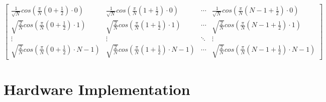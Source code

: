 \begin{center}	
$ \begin{bmatrix} \frac{1}{\sqrt{N}}cos(\frac{\pi}{N}(0+\frac{1}{2})\cdotp 0) & \frac{1}{\sqrt{N}}cos(\frac{\pi}{N}(1+\frac{1}{2})\cdotp 0) & \cdots & \frac{1}{\sqrt{N}}cos(\frac{\pi}{N}(N-1+\frac{1}{2})\cdotp 0) \\
\sqrt{\frac{2}{N}}cos(\frac{\pi}{N}(0+\frac{1}{2})\cdotp 1) & \sqrt{\frac{2}{N}}cos(\frac{\pi}{N}(1+\frac{1}{2})\cdotp 1) & \cdots & \sqrt{\frac{2}{N}}cos(\frac{\pi}{N}(N-1+\frac{1}{2})\cdotp 1) \\
\vdots  & \vdots  & \ddots & \vdots  \\
\sqrt{\frac{2}{N}}cos(\frac{\pi}{N}(0+\frac{1}{2})\cdotp N-1) & \sqrt{\frac{2}{N}}cos(\frac{\pi}{N}(1+\frac{1}{2})\cdotp N-1) & \cdots & \sqrt{\frac{2}{N}}cos(\frac{\pi}{N}(N-1+\frac{1}{2})\cdotp N-1) \end{bmatrix} $
\bigskip
\end{center}

  \section{Hardware Implementation} \label{DCTH}
